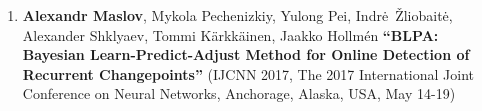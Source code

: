 \begin{enumerate}[leftmargin=0.2cm]
  \item \textbf{Alexandr Maslov}, Mykola Pechenizkiy, Yulong Pei, Indr\.e~\v{Z}liobait\.e, Alexander Shklyaev, Tommi K\"{a}rkk\"{a}inen, Jaakko Hollm{\'e}n
\textbf{``BLPA: Bayesian Learn-Predict-Adjust Method for Online  Detection of Recurrent Changepoints''}
(IJCNN 2017, The 2017 International Joint Conference on Neural Networks, Anchorage, Alaska, USA, May 14-19)

\end{enumerate}
